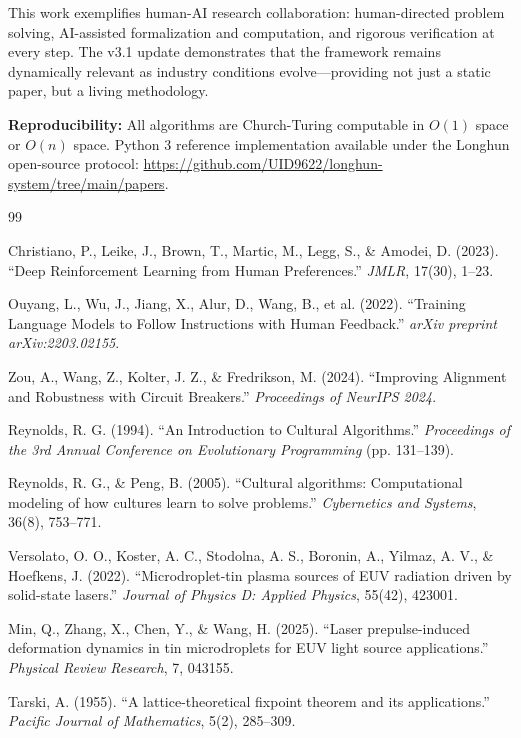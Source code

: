 \documentclass[twocolumn]{article}
\begin{document}
This work exemplifies human-AI research collaboration: human-directed problem solving, AI-assisted formalization and computation, and rigorous verification at every step. The v3.1 update demonstrates that the framework remains dynamically relevant as industry conditions evolve—providing not just a static paper, but a living methodology.

\textbf{Reproducibility:} All algorithms are Church-Turing computable in $O(1)$ space or $O(n)$ space. Python 3 reference implementation available under the Longhun open-source protocol: \url{https://github.com/UID9622/longhun-system/tree/main/papers}.

\begin{thebibliography}{99}

Christiano, P., Leike, J., Brown, T., Martic, M., Legg, S., \& Amodei, D. (2023).
``Deep Reinforcement Learning from Human Preferences.''
\textit{JMLR}, 17(30), 1--23.

Ouyang, L., Wu, J., Jiang, X., Alur, D., Wang, B., et al. (2022).
``Training Language Models to Follow Instructions with Human Feedback.''
\textit{arXiv preprint arXiv:2203.02155}.

Zou, A., Wang, Z., Kolter, J. Z., \& Fredrikson, M. (2024).
``Improving Alignment and Robustness with Circuit Breakers.''
\textit{Proceedings of NeurIPS 2024}.

Reynolds, R. G. (1994).
``An Introduction to Cultural Algorithms.''
\textit{Proceedings of the 3rd Annual Conference on Evolutionary Programming} (pp. 131--139).

Reynolds, R. G., \& Peng, B. (2005).
``Cultural algorithms: Computational modeling of how cultures learn to solve problems.''
\textit{Cybernetics and Systems}, 36(8), 753--771.

Versolato, O. O., Koster, A. C., Stodolna, A. S., Boronin, A., Yilmaz, A. V., \& Hoefkens, J. (2022).
``Microdroplet-tin plasma sources of EUV radiation driven by solid-state lasers.''
\textit{Journal of Physics D: Applied Physics}, 55(42), 423001.

Min, Q., Zhang, X., Chen, Y., \& Wang, H. (2025).
``Laser prepulse-induced deformation dynamics in tin microdroplets for EUV light source applications.''
\textit{Physical Review Research}, 7, 043155.

Tarski, A. (1955).
``A lattice-theoretical fixpoint theorem and its applications.''
\textit{Pacific Journal of Mathematics}, 5(2), 285--309.


\end{thebibliography}
\end{document}
